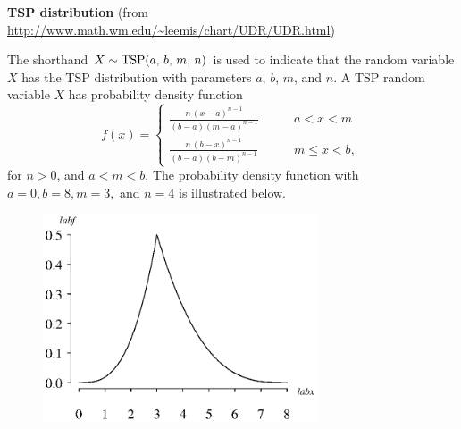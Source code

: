 \documentclass[12pt,fullpage]{article}
\begin{document}
\noindent
{\bf TSP distribution} (from \color{blue}\url{http://www.math.wm.edu/~leemis/chart/UDR/UDR.html}\color{black})

\noindent
The shorthand $X \sim {\rm TSP}(a,\, b,\, m,\, n)$ is used to indicate that the
random variable $X$ has the TSP distribution with parameters $a$, $b$, $m$, and $n$.
A TSP random variable $X$ has probability density function 
$$
f(x) = \left\{ \begin{array}{ll}
		\frac {n\, \left( x - a \right) ^ {n - 1}}{ \left( b - a \right) 
 \left( m - a \right) ^ {n - 1}} & \qquad a < x < m \\
		\frac {n \, \left( b - x \right) ^
{n - 1}} { \left( b - a \right)  \left( b - m \right) ^ {n - 1}} & \qquad m \leq x < b,
		\end{array} \right. \, 
$$
for $n > 0$, and $a < m < b$. The probability density function with $a = 0, b = 8, m = 3,$ and $n=4$ is illustrated below.

\begin{figure}[h!]
\begin{center}
\includegraphics[width=3.2in]{TSPPlot.ps}
\end{center}
\end{figure}
\end{document}
